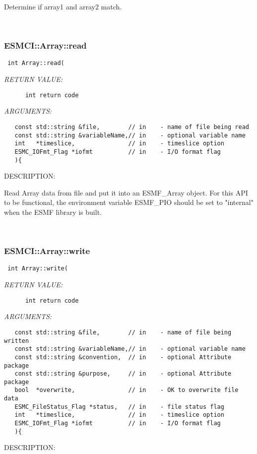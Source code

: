       Determine if array1 and array2 match.
   
 
\mbox{}\hrulefill\
 
\subsubsection [ESMCI::Array::read] {ESMCI::Array::read}


  
\begin{verbatim} int Array::read(\end{verbatim}{\em RETURN VALUE:}
\begin{verbatim}      int return code\end{verbatim}{\em ARGUMENTS:}
\begin{verbatim}   const std::string &file,        // in    - name of file being read
   const std::string &variableName,// in    - optional variable name
   int   *timeslice,               // in    - timeslice option
   ESMC_IOFmt_Flag *iofmt          // in    - I/O format flag
   ){\end{verbatim}
{\sf DESCRIPTION:\\ }


     Read Array data from file and put it into an ESMF_Array object.
     For this API to be functional, the environment variable ESMF_PIO
     should be set to "internal" when the ESMF library is built.
   
 
\mbox{}\hrulefill\
 
\subsubsection [ESMCI::Array::write] {ESMCI::Array::write}


  
\begin{verbatim} int Array::write(\end{verbatim}{\em RETURN VALUE:}
\begin{verbatim}      int return code\end{verbatim}{\em ARGUMENTS:}
\begin{verbatim}   const std::string &file,        // in    - name of file being written
   const std::string &variableName,// in    - optional variable name
   const std::string &convention,  // in    - optional Attribute package
   const std::string &purpose,     // in    - optional Attribute package
   bool  *overwrite,               // in    - OK to overwrite file data
   ESMC_FileStatus_Flag *status,   // in    - file status flag
   int   *timeslice,               // in    - timeslice option
   ESMC_IOFmt_Flag *iofmt          // in    - I/O format flag
   ){\end{verbatim}
{\sf DESCRIPTION:\\ }


